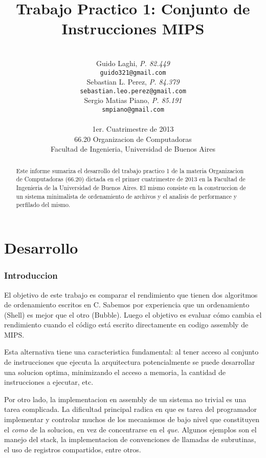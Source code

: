 \documentclass[a4paper,11pt]{article}
\title{\textbf{Trabajo Practico 1: Conjunto de Instrucciones MIPS}}
\author{\\
  Guido Laghi, \textit{P. 82.449}                                  \\
  \texttt{guido321@gmail.com}                                      \\ [2.5ex]
  Sebastian L. Perez, \textit{P. 84.379}                           \\
  \texttt{sebastian.leo.perez@gmail.com}                           \\ [2.5ex]
  Sergio Matias Piano, \textit{P. 85.191}                          \\
  \texttt{smpiano@gmail.com}                                       \\ [2.5ex]
                                                                   \\
  \normalsize{1er. Cuatrimestre de 2013}                           \\
  \normalsize{66.20 Organizacion de Computadoras}                  \\
  \normalsize{Facultad de Ingenieria, Universidad de Buenos Aires} \\
}
\date{}
\begin{document}
\thispagestyle{empty}
\maketitle

\begin{abstract}

  Este informe sumariza el desarrollo del trabajo practico 1 de la materia
  Organizacion de Computadoras (66.20) dictada en el primer cuatrimestre de
  2013 en la Facultad de Ingenieria de la Universidad de Buenos Aires. El mismo
  consiste en la construccion de un sistema minimalista de ordenamiento de
  archivos y el analisis de performance y perfilado del mismo.

\end{abstract}

\clearpage

\tableofcontents
\clearpage


\part{Desarrollo}

\section{Introduccion}

  El objetivo de este trabajo es comparar el rendimiento que tienen dos
  algoritmos de ordenamiento escritos en C. Sabemos por experiencia que
  un ordenamiento (Shell) es mejor que el otro (Bubble). Luego el objetivo
  es evaluar cómo cambia el rendimiento cuando el código está escrito
  directamente en codigo assembly de MIPS.

  Esta alternativa tiene una caracteristica fundamental: al tener
  acceso al conjunto de instrucciones que ejecuta la arquitectura potencialmente
  se puede desarrollar una solucion optima, minimizando el acceso a memoria, la
  cantidad de instrucciones a ejecutar, etc.

  Por otro lado, la implementacion en assembly de un sistema no trivial es una
  tarea complicada. La dificultad principal radica en que es tarea del
  programador implementar y controlar muchos de los mecanismos de bajo nivel que
  constituyen el \textit{como} de la solucion, en vez de concentrarse en el
  \textit{que}. Algunos ejemplos son el manejo del stack, la implementacion de
  convenciones de llamadas de subrutinas, el uso de registros compartidos, entre
  otros.
\end{document}
